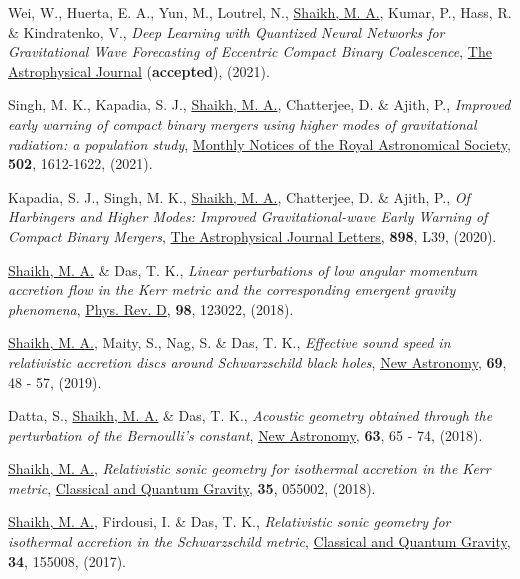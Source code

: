 \begin{etaremune}
\item Wei, W., Huerta, E. A., Yun, M., Loutrel, N.,  \underline{Shaikh, M. A.}, Kumar, P., Hass, R. \& Kindratenko, V., {\itshape  Deep Learning with Quantized Neural Networks for Gravitational Wave Forecasting of Eccentric Compact Binary Coalescence}, \href{https://iopscience.iop.org/journal/0004-637X}{The Astrophysical Journal} ({\bfseries accepted}), (2021).
\item Singh, M. K., Kapadia, S. J., \underline{Shaikh, M. A.}, Chatterjee, D. \& Ajith, P., {\itshape {Improved early warning of compact binary mergers using higher modes of gravitational radiation: a population study}}, \href{https://doi.org/10.1093/mnras/stab125}{{Monthly Notices of the Royal Astronomical Society}}, {\bfseries 502}, 1612-1622, (2021).
\item Kapadia, S. J., Singh, M. K., \underline{Shaikh, M. A.}, Chatterjee, D. \& Ajith, P., {\itshape Of Harbingers and Higher Modes: Improved Gravitational-wave Early Warning of Compact Binary Mergers}, \href{https://doi.org/10.3847%2F2041-8213%2Faba42d}{{The Astrophysical Journal Letters}}, {\bfseries 898}, L39, (2020).
\item \underline{Shaikh, M. A.} \& Das, T. K., {\itshape Linear perturbations of low angular momentum accretion flow in the Kerr metric and the corresponding emergent gravity phenomena}, \href{https://link.aps.org/doi/10.1103/PhysRevD.98.123022}{{Phys. Rev. D}}, {\bfseries 98}, 123022, (2018).
\item \underline{Shaikh, M. A.}, Maity, S., Nag, S. \& Das, T. K., {\itshape Effective sound speed in relativistic accretion discs around Schwarzschild black holes}, \href{http://www.sciencedirect.com/science/article/pii/S1384107618302896}{{New Astronomy}}, {\bfseries 69}, 48 - 57, (2019).
\item Datta, S., \underline{Shaikh, M. A.} \& Das, T. K., {\itshape Acoustic geometry obtained through the perturbation of the Bernoulli’s constant}, \href{http://www.sciencedirect.com/science/article/pii/S1384107617301847}{{New Astronomy}}, {\bfseries 63}, 65 - 74, (2018).
\item \underline{Shaikh, M. A.}, {\itshape Relativistic sonic geometry for isothermal accretion in the Kerr metric}, \href{https://doi.org/10.1088%2F1361-6382%2Faaa5cd}{{Classical and Quantum Gravity}}, {\bfseries 35}, 055002, (2018).
\item \underline{Shaikh, M. A.}, Firdousi, I. \& Das, T. K., {\itshape Relativistic sonic geometry for isothermal accretion in the Schwarzschild metric}, \href{https://doi.org/10.1088%2F1361-6382%2Faa7b19}{{Classical and Quantum Gravity}}, {\bfseries 34}, 155008, (2017).
\end{etaremune}
